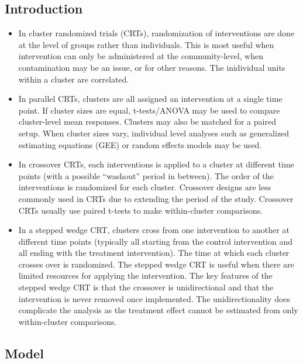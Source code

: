 \documentclass[10pt]{article}
\begin{document}
\iffalse
\subsection{Introduction}

\begin{itemize}

\item
In cluster randomized trials (CRTs), randomization of interventions are done at the level of groups rather than individuals. This is most useful when intervention can only be administered at the community-level, when contamination may be an issue, or for other reasons. The inidividual units within a cluster are correlated.

\item
In parallel CRTs, clusters are all assigned an intervention at a single time point. If cluster sizes are equal, t-tests/ANOVA may be used to compare cluster-level mean responses. Clusters may also be matched for a paired setup. When cluster sizes vary, individual level analyses such as generalized estimating equations (GEE) or random effects models may be used.

\item
In crossover CRTs, each interventions is applied to a cluster at different time points (with a possible ``washout'' period in between). The order of the interventions is randomized for each cluster. Crossover designs are less commonly used in CRTs due to extending the period of the study. Crossover CRTs usually use paired t-tests to make within-cluster comparisons.

\item
In a stepped wedge CRT, clusters cross from one intervention to another at different time points (typically all starting from the control intervention and all ending with the treatment intervention). The time at which each cluster crosses over is randomized. The stepped wedge CRT is useful when there are limited resources for applying the intervention. The key features of the stepped wedge CRT is that the crossover is unidirectional and that the intervention is never removed once implemented. The unidirectionality does complicate the analysis as the treatment effect cannot be estimated from only within-cluster comparisons.

\end{itemize}

\subsection{Model}
\end{document}
